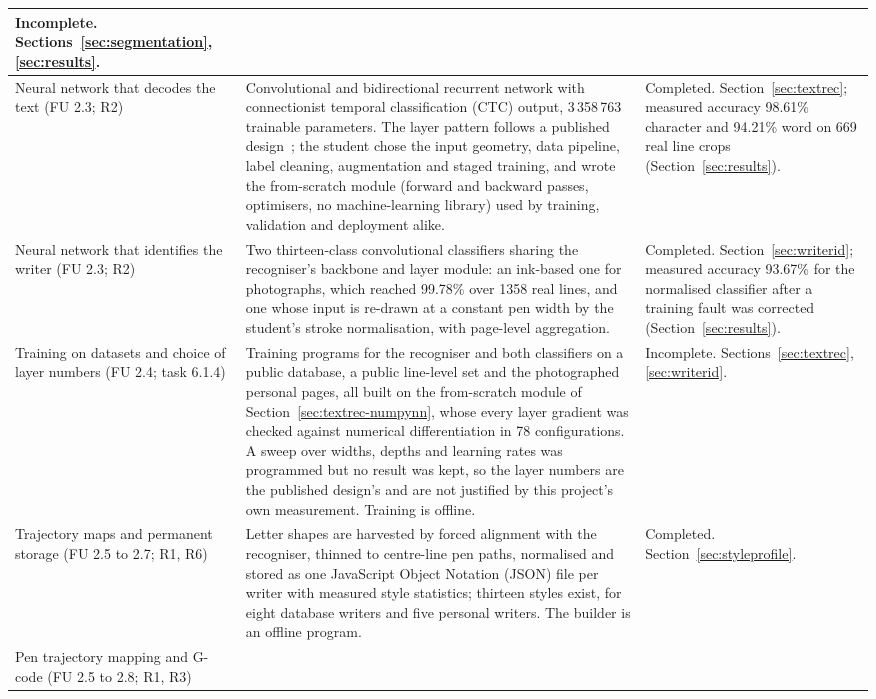 \begin{table}[!htbp]
\begin{tabular}{|p{3.1cm}|p{7.4cm}|p{3.7cm}|}
Incomplete. Sections~\ref{sec:segmentation}, \ref{sec:results}. \\
\hline
Neural network that decodes the text (FU 2.3; R2) &
Convolutional and bidirectional recurrent network with connectionist temporal classification (CTC) output, 3\,358\,763 trainable parameters. The layer pattern follows a published design~\cite{kizilirmak2023}; the student chose the input geometry, data pipeline, label cleaning, augmentation and staged training, and wrote the from-scratch module (forward and backward passes, optimisers, no machine-learning library) used by training, validation and deployment alike. &
Completed. Section~\ref{sec:textrec}; measured accuracy 98.61\% character and 94.21\% word on 669 real line crops (Section~\ref{sec:results}). \\
\hline
Neural network that identifies the writer (FU 2.3; R2) &
Two thirteen-class convolutional classifiers sharing the recogniser's backbone and layer module: an ink-based one for photographs, which reached 99.78\% over 1358 real lines, and one whose input is re-drawn at a constant pen width by the student's stroke normalisation, with page-level aggregation. &
Completed. Section~\ref{sec:writerid}; measured accuracy 93.67\% for the normalised classifier after a training fault was corrected (Section~\ref{sec:results}). \\
\hline
Training on datasets and choice of layer numbers (FU 2.4; task 6.1.4) &
Training programs for the recogniser and both classifiers on a public database, a public line-level set and the photographed personal pages, all built on the from-scratch module of Section~\ref{sec:textrec-numpynn}, whose every layer gradient was checked against numerical differentiation in 78 configurations. A sweep over widths, depths and learning rates was programmed but no result was kept, so the layer numbers are the published design's and are not justified by this project's own measurement. Training is offline. &
Incomplete. Sections~\ref{sec:textrec}, \ref{sec:writerid}. \\
\hline
Trajectory maps and permanent storage (FU 2.5 to 2.7; R1, R6) &
Letter shapes are harvested by forced alignment with the recogniser, thinned to centre-line pen paths, normalised and stored as one JavaScript Object Notation (JSON) file per writer with measured style statistics; thirteen styles exist, for eight database writers and five personal writers. The builder is an offline program. &
Completed. Section~\ref{sec:styleprofile}. \\
\hline
Pen trajectory mapping and G-code (FU 2.5 to 2.8; R1, R3) &

\end{tabular}
\end{table}
